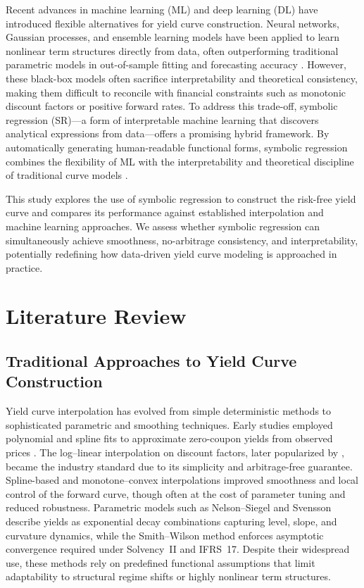 \documentclass[12pt]{report}
\begin{document}
Recent advances in machine learning (ML) and deep learning (DL) have introduced flexible alternatives for yield curve construction.  
Neural networks, Gaussian processes, and ensemble learning models have been applied to learn nonlinear term structures directly from data, often outperforming traditional parametric models in out-of-sample fitting and forecasting accuracy \parencite{Chen2019,Lim2023,Heaton2020,Cao2021}.  
However, these black-box models often sacrifice interpretability and theoretical consistency, making them difficult to reconcile with financial constraints such as monotonic discount factors or positive forward rates.  
To address this trade-off, symbolic regression (SR)—a form of interpretable machine learning that discovers analytical expressions from data—offers a promising hybrid framework.  
By automatically generating human-readable functional forms, symbolic regression combines the flexibility of ML with the interpretability and theoretical discipline of traditional curve models \parencite{SchmidtLipson2009,UdrescuTegmark2020,Cornelissen2023,Chen2022}.  

This study explores the use of symbolic regression to construct the risk-free yield curve and compares its performance against established interpolation and machine learning approaches.  
We assess whether symbolic regression can simultaneously achieve smoothness, no-arbitrage consistency, and interpretability, potentially redefining how data-driven yield curve modeling is approached in practice.

\chapter{Literature Review}

\section{Traditional Approaches to Yield Curve Construction}

Yield curve interpolation has evolved from simple deterministic methods to sophisticated parametric and smoothing techniques.  
Early studies employed polynomial and spline fits to approximate zero-coupon yields from observed prices \parencite{McCulloch1975,deBoor1978}.  
The log–linear interpolation on discount factors, later popularized by \textcite{BrigoMercurio2006}, became the industry standard due to its simplicity and arbitrage-free guarantee.  
Spline-based and monotone–convex interpolations \parencite{HaganWest2006} improved smoothness and local control of the forward curve, though often at the cost of parameter tuning and reduced robustness.  
Parametric models such as Nelson–Siegel and Svensson \parencite{NelsonSiegel1987,Svensson1994} describe yields as exponential decay combinations capturing level, slope, and curvature dynamics, while the Smith–Wilson method \parencite{SmithWilson2001,EIOPA2018} enforces asymptotic convergence required under Solvency~II and IFRS~17.  
Despite their widespread use, these methods rely on predefined functional assumptions that limit adaptability to structural regime shifts or highly nonlinear term structures.
\end{document}
